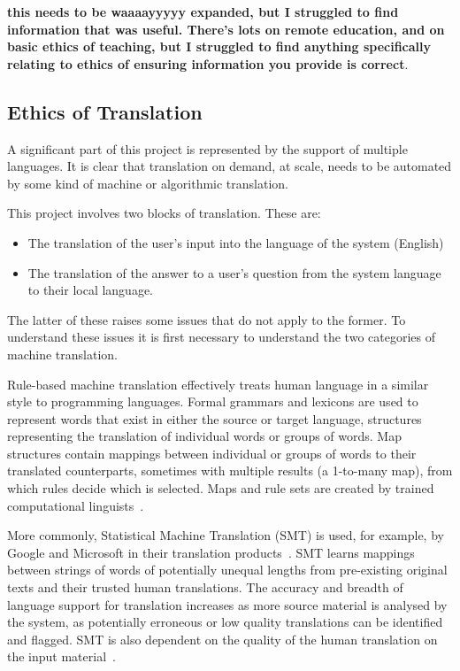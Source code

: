 \documentclass[authoryearcitations]{UoYCSproject}
\begin{document}
{\bf this needs to be waaaayyyyy expanded, but I struggled to find information that was useful.  There's lots on remote education, and on basic ethics of teaching, but I struggled to find anything specifically relating to ethics of ensuring information you provide is correct}.


\subsection{Ethics of Translation}
\label{subsec:ethicsOfTranslation}
A significant part of this project is represented by the support of multiple languages.  It is clear that translation on demand, at scale, needs to be automated by some kind of machine or algorithmic translation.

This project involves two blocks of translation.  These are:
\begin{itemize}
  \item The translation of the user's input into the language of the system (English)
  \item The translation of the answer to a user's question from the system language to their local language.
\end{itemize}
The latter of these raises some issues that do not apply to the former. To understand these issues it is first necessary to understand the two categories of machine translation.

Rule-based machine translation effectively treats human language in a similar style to programming languages.  Formal grammars and lexicons are used to represent words that exist in either the source or target language, structures representing the translation of individual words or groups of words.  Map structures contain mappings between individual or groups of words to their translated counterparts, sometimes with multiple results (a 1-to-many map), from which rules decide which is selected.  Maps and rule sets are created by trained computational linguists~\cite{kenny2011ethics}.

More commonly, Statistical Machine Translation (SMT) is used, for example, by Google and Microsoft in their translation products~\cite{kenny2011ethics, Google_Translate_Research}.  SMT learns mappings between strings of words of potentially unequal lengths from pre-existing original texts and their trusted human translations.  The accuracy and breadth of language support for translation increases as more source material is analysed by the system, as potentially erroneous or low quality translations can be identified and flagged.  SMT is also dependent on the quality of the human translation on the input material~\cite{kenny2011ethics}.
\end{document}
